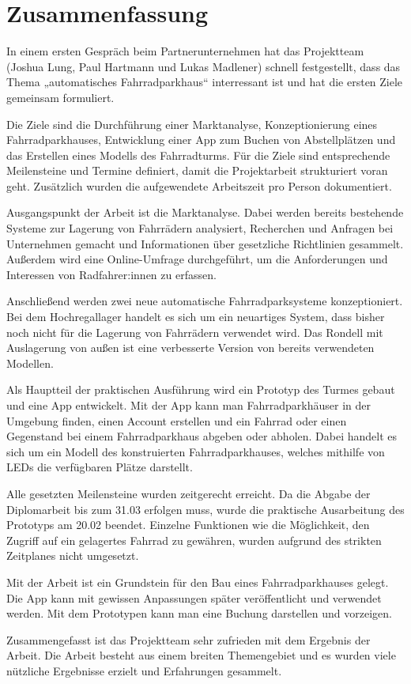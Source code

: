 \section{Zusammenfassung}

In einem ersten Gespräch beim Partnerunternehmen hat das Projektteam (Joshua Lung, Paul Hartmann und Lukas Madlener) schnell festgestellt, dass das Thema „automatisches Fahrradparkhaus“ interressant ist und hat die ersten Ziele gemeinsam formuliert.

\noindent Die Ziele sind die Durchführung einer Marktanalyse, Konzeptionierung eines Fahrradparkhauses, Entwicklung einer App zum Buchen von Abstellplätzen und das Erstellen eines Modells des Fahrradturms. Für die Ziele sind entsprechende Meilensteine und Termine definiert, damit die Projektarbeit strukturiert voran geht. Zusätzlich wurden die aufgewendete Arbeitszeit pro Person dokumentiert.

\bigskip


\noindent Ausgangspunkt der Arbeit ist die Marktanalyse. Dabei werden bereits bestehende Systeme zur Lagerung von Fahrrädern analysiert, Recherchen und Anfragen bei Unternehmen gemacht und Informationen über gesetzliche Richtlinien gesammelt. Außerdem wird eine Online-Umfrage durchgeführt, um die Anforderungen und Interessen von Radfahrer:innen zu erfassen.

\smallskip \noindent Anschließend werden zwei neue automatische Fahrradparksysteme konzeptioniert. Bei dem Hochregallager handelt es sich um ein neuartiges System, dass bisher noch nicht für die Lagerung von Fahrrädern verwendet wird. Das Rondell mit Auslagerung von außen ist eine verbesserte Version von bereits verwendeten Modellen.

\smallskip \noindent Als Hauptteil der praktischen Ausführung wird ein Prototyp des Turmes gebaut und eine App entwickelt. Mit der App kann man Fahrradparkhäuser in der Umgebung finden, einen Account erstellen und ein Fahrrad oder einen Gegenstand bei einem Fahrradparkhaus abgeben oder abholen. Dabei handelt es sich um ein Modell des konstruierten Fahrradparkhauses, welches mithilfe von LEDs die verfügbaren Plätze darstellt.

\smallskip \noindent Alle gesetzten Meilensteine wurden zeitgerecht erreicht. Da die Abgabe der Diplomarbeit bis zum 31.03 erfolgen muss, wurde die praktische Ausarbeitung des Prototyps am 20.02 beendet. Einzelne Funktionen wie die Möglichkeit, den Zugriff auf ein gelagertes Fahrrad zu gewähren, wurden aufgrund des strikten Zeitplanes nicht umgesetzt.

\bigskip


\noindent Mit der Arbeit ist ein Grundstein für den Bau eines Fahrradparkhauses gelegt. Die App kann mit gewissen Anpassungen später veröffentlicht und verwendet werden. Mit dem Prototypen kann man eine Buchung darstellen und vorzeigen.

\noindent Zusammengefasst ist das Projektteam sehr zufrieden mit dem Ergebnis der Arbeit. Die Arbeit besteht aus einem breiten Themengebiet und es wurden viele nützliche Ergebnisse erzielt und Erfahrungen gesammelt.
